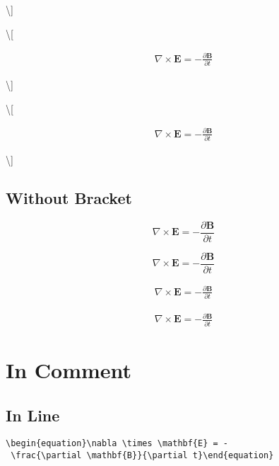 \documentclass[]{article}
\begin{document}
\textbackslash{}{]}

\textbackslash{}{[}

\begin{align}
\nabla \times \mathbf{E} = - \frac{\partial \mathbf{B}}{\partial t}
\end{align}

\textbackslash{}{]}

\textbackslash{}{[}

\begin{align*}
\nabla \times \mathbf{E} = - \frac{\partial \mathbf{B}}{\partial t}
\end{align*}

\textbackslash{}{]}

\subsection{Without Bracket}\label{without-bracket}

\begin{equation}
\nabla \times \mathbf{E} = - \frac{\partial \mathbf{B}}{\partial t}
\end{equation}

\begin{equation*}
\nabla \times \mathbf{E} = - \frac{\partial \mathbf{B}}{\partial t}
\end{equation*}

\begin{align}
\nabla \times \mathbf{E} = - \frac{\partial \mathbf{B}}{\partial t}
\end{align}

\begin{align*}
\nabla \times \mathbf{E} = - \frac{\partial \mathbf{B}}{\partial t}
\end{align*}

\section{In Comment}\label{in-comment}

\subsection{In Line}\label{in-line}

\texttt{\textbackslash{}begin\{equation\}\textbackslash{}nabla\ \textbackslash{}times\ \textbackslash{}mathbf\{E\}\ =\ -\ \textbackslash{}frac\{\textbackslash{}partial\ \textbackslash{}mathbf\{B\}\}\{\textbackslash{}partial\ t\}\textbackslash{}end\{equation\}}
\end{document}
